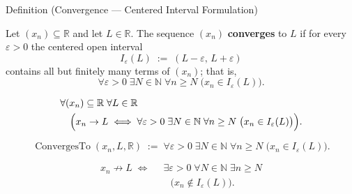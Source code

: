 \begin{definitionbox}{Definition (Convergence --- Centered Interval Formulation)}
\begin{definition}
\label{def:convergent-sequence-neighborhood}

Let $(x_n) \subseteq \mathbb{R}$ and let $L \in \mathbb{R}$. The sequence
$(x_n)$ \textbf{converges} to $L$ if for every $\varepsilon > 0$ the
centered open interval
\[
    I_\varepsilon(L) \;:=\; (L - \varepsilon,\, L + \varepsilon)
\]
contains all but finitely many terms of $(x_n)$; that is,
\[
    \forall \varepsilon > 0 \;\exists N \in \mathbb{N} \;\forall n \ge N
    \;\bigl(x_n \in I_\varepsilon(L)\bigr).
\]
\end{definition}
\end{definitionbox}

\begin{remark*}
\[
\begin{aligned}
&\forall (x_n) \subseteq \mathbb{R} \;\forall L \in \mathbb{R}\\
&\quad\Bigl(
    x_n \to L
    \;\Longleftrightarrow\;
    \forall \varepsilon > 0 \;\exists N \in \mathbb{N} \;\forall n \ge N
    \;\bigl(x_n \in I_\varepsilon(L)\bigr)
\Bigr).
\end{aligned}
\]
\end{remark*}

\begin{remark*}
\[
\operatorname{ConvergesTo}(x_n,L,\mathbb R)
\;:=\;
\forall \varepsilon > 0 \;\exists N \in \mathbb{N} \;\forall n \ge N
\;\bigl(x_n \in I_\varepsilon(L)\bigr).
\]
\end{remark*}

\begin{remark*}
\[
\begin{aligned}
x_n \not\to L
\;\Longleftrightarrow\;
&\;\exists \varepsilon > 0 \;\forall N \in \mathbb{N} \;\exists n \ge N\\
&\quad\bigl(x_n \notin I_\varepsilon(L)\bigr).
\end{aligned}
\]
\end{remark*}

